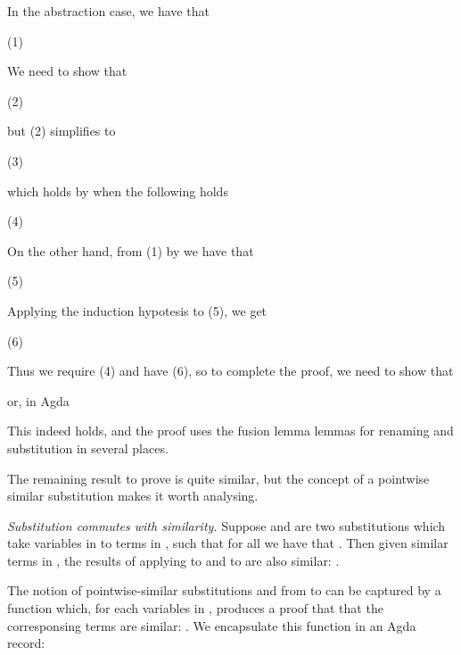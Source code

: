 \documentclass[bsc,frontabs,twoside,singlespacing,parskip,deptreport]{infthesis}
\theoremstyle{definition}
\begin{document}
In the abstraction case, we have that

 (1)

We need to show that

 (2)

but (2) simplifies to

 (3)

which holds by  when the following holds

 (4)

On the other hand, from (1) by  we have that

 (5)

Applying the induction hypotesis to (5), we get

 (6)

Thus we require (4) and have (6), so to complete the proof, we need to
show that 


or, in Agda


This indeed holds, and the proof uses the fusion lemma lemmas for
renaming and substitution in several places.

The remaining result to prove is quite similar, but the concept of a
pointwise similar substitution makes it worth analysing.

\textit{Substitution commutes with similarity.} Suppose  and 
are two 
substitutions which take variables  in  to terms in ,
such that for all  we have that . Then given similar terms  in , the results
of applying  to  and  to  are also
similar: .

The notion of pointwise-similar substitutions  and  from
 to 
can be captured by a function which, for each variables  in
, produces a proof that that the corresponsing terms are
similar: . We encapsulate this function
in an Agda record:

\end{document}
